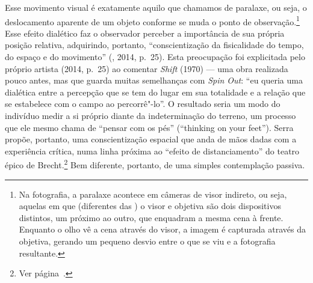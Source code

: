 Esse movimento visual é exatamente aquilo que chamamos de paralaxe, ou
seja, o deslocamento aparente de um objeto conforme se muda o ponto de
observação.\footnote{Na fotografia, a paralaxe acontece em câmeras de visor indireto, ou seja, aquelas em que (diferentes das {}) o visor e objetiva são dois dispositivos distintos, um próximo ao outro, que enquadram a mesma cena à frente. Enquanto o olho vê a cena através do visor, a imagem é capturada através da objetiva, gerando um pequeno desvio entre o que se viu e a fotografia resultante.} Esse efeito dialético faz o observador perceber a
importância de sua própria posição relativa, adquirindo, portanto,
``conscientização da fisicalidade do tempo, do espaço e do movimento''
(, 2014, p.~25). Esta preocupação foi explicitada pelo próprio
artista (2014, p.~25) ao comentar \emph{Shift} (1970) --- uma obra
realizada pouco antes, mas que guarda muitas semelhanças com \emph{Spin
Out}: ``eu queria uma dialética entre a percepção que se tem do lugar em sua totalidade e a relação que se estabelece com o campo ao percorrê"-lo''. O resultado seria um modo do indivíduo medir a si próprio diante da indeterminação do terreno, um processo que ele mesmo chama de ``pensar com os pés'' (``thinking on your feet''). Serra propõe, portanto, uma conscientização espacial que anda de mãos dadas com a experiência crítica, numa linha próxima ao ``efeito de distanciamento'' do teatro épico de Brecht.\footnote{Ver página~\pageref{brecht}.} Bem diferente, portanto, de uma simples contemplação passiva.

